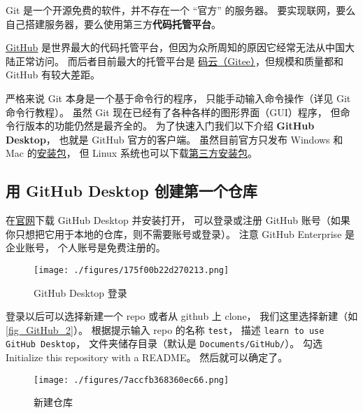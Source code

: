 Git 是一个开源免费的软件，并不存在一个 “官方” 的服务器。 要实现联网，要么自己搭建服务器，要么使用第三方\textbf{代码托管平台}。

\href{https://github.com/}{GitHub} 是世界最大的代码托管平台，但因为众所周知的原因它经常无法从中国大陆正常访问。 而后者目前最大的托管平台是 \href{https://gitee.com/}{码云（Gitee）}，但规模和质量都和 GitHub 有较大差距。


严格来说 Git 本身是一个基于命令行的程序， 只能手动输入命令操作（详见 Git 命令行教程）。 虽然 Git 现在已经有了各种各样的图形界面（GUI）程序， 但命令行版本的功能仍然是最齐全的。 为了快速入门我们以下介绍 \textbf{GitHub Desktop}， 也就是 GitHub 官方的客户端。 虽然目前官方只发布 Windows 和 Mac 的\href{https://desktop.github.com/}{安装包}， 但 Linux 系统也可以下载\href{https://github.com/shiftkey/desktop/releases}{第三方安装包}。

\subsection{用 GitHub Desktop 创建第一个仓库}
在\href{https://desktop.github.com/}{官网}下载 GitHub Desktop 并安装打开， 可以登录或注册 GitHub 账号（如果你只想把它用于本地的仓库，则不需要账号或登录）。 注意 GitHub Enterprise 是企业账号， 个人账号是免费注册的。 %

\begin{figure}[ht]
\centering
\texttt{[image: ./figures/175f00b22d270213.png]}
\caption{GitHub Desktop 登录} \label{fig_GitHub_1}
\end{figure}

登录以后可以选择新建一个 repo 或者从 github 上 clone， 我们这里选择新建（如\autoref{fig_GitHub_2}）。 根据提示输入 repo 的名称 \verb|test|， 描述 \verb|learn to use GitHub Desktop|， 文件夹储存目录（默认是 \verb|Documents/GitHub/|）。 勾选 Initialize this repository with a README。 然后就可以确定了。

\begin{figure}[ht]
\centering
\texttt{[image: ./figures/7accfb368360ec66.png]}
\caption{新建仓库} \label{fig_GitHub_2}
\end{figure}

